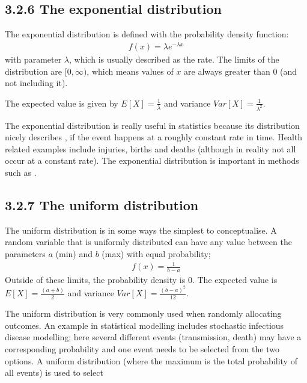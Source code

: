 \documentclass[letterpaper,10pt,english]{jupyterBook}
\begin{document}
\subsection{3.2.6 The exponential distribution}
\label{\detokenize{03.c. Continuous Probability Distributions:the-exponential-distribution}}
\sphinxAtStartPar
The exponential distribution is defined with the probability density function:
\begin{equation*}
\begin{split}f(x)=\lambda e^{-\lambda x}\end{split}
\end{equation*}
\sphinxAtStartPar
with parameter \(\lambda\), which is usually described as the rate. The limits of the distribution are \([0,\infty)\), which means values of \(x\) are always greater than 0 (and not including it).

\sphinxAtStartPar
The expected value is given by \(E[X]=\frac{1}{\lambda}\) and variance \(Var[X]=\frac{1}{\lambda^2}\).

\sphinxAtStartPar
The exponential distribution is really useful in statistics because its distribution nicely describes , if the event happens at a roughly constant rate in time. Health related examples include injuries, births and deaths (although in reality not all occur at a constant rate). The exponential distribution is important in methods such as .


\subsection{3.2.7 The uniform distribution}
\label{\detokenize{03.c. Continuous Probability Distributions:the-uniform-distribution}}
\sphinxAtStartPar
The uniform distribution is in some ways the simplest to conceptualise. A random variable that is uniformly distributed can have any value between the parameters \(a\) (min) and \(b\) (max) with equal probability;
\begin{equation*}
\begin{split}f(x)= \frac{1}{b-a}\end{split}
\end{equation*}
\sphinxAtStartPar
Outside of these limits, the probability density is 0. The expected value is \(E[X] = \frac{(a+b)}{2}\) and variance \(Var[X] = \frac{(b-a)^2}{12}\).

\sphinxAtStartPar
The uniform distribution is very commonly used when randomly allocating outcomes. An example in statistical modelling includes stochastic infectious disease modelling; here several different events (transmission, death) may have a corresponding probability and one event needs to be selected from the two options. A uniform distribution (where the maximum is the total probability of all events) is used to select
\end{document}
